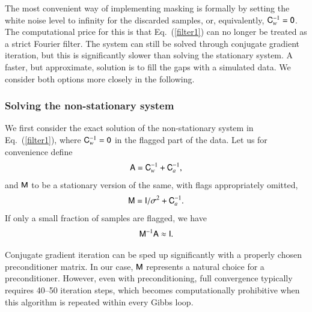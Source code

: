 \documentclass[twocolumn]{aa}
\newcommand{\ma}[1]{\tens{#1}}
\begin{document}
The most convenient way of implementing masking is formally by setting
the white noise level to infinity for the discarded samples, or,
equivalently, $\ma C_w^{-1}=\ma 0$.  The computational price for this is
that Eq.~(\ref{filter1}) can no longer be treated as a strict Fourier
filter.  The system can still be solved through conjugate gradient
iteration, but this is significantly slower than solving the
stationary system.  A faster, but approximate, solution is to fill the
gaps with a simulated data.  We consider both options more closely in
the following.

\subsubsection{Solving the non-stationary system}
\label{sec:nonstationary}

We first consider the exact solution of the non-stationary system in
Eq.~(\ref{filter1}), where $\ma C_w^{-1}=\ma 0$ in the flagged part of the
data.  Let us for convenience define
%
\begin{equation}
\ma A = \ma C_w^{-1} +\ma C_a^{-1},
\end{equation}
%
and $\ma M$ to be a stationary version of the same, with flags
appropriately omitted,
%
\begin{equation}
\ma M = \ma I/\sigma^2 +\ma C_a^{-1} .  \label{Mdef}
\end{equation}
%
If only a small fraction of samples are flagged, we have
%
\begin{equation}
{\ma M}^{-1} \ma A \approx \ma I.
\end{equation}
%

Conjugate gradient iteration can be sped up significantly with a
properly chosen preconditioner matrix. In our case, $\ma M$ represents
a natural choice for a preconditioner.  However, even with
preconditioning, full convergence typically requires 40--50 iteration
steps, which becomes computationally prohibitive when this algorithm
is repeated within every Gibbs loop.
\end{document}

